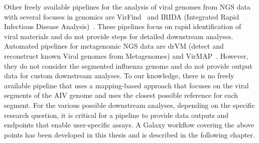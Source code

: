 Other freely available pipelines for the analysis of viral genomes from NGS data with several focuses in genomics are VirFind~\cite{ho2014development} and IRIDA (Integrated Rapid Infectious Disease Analysis)~\cite{matthews2018integrated}. These pipelines focus on rapid identification of viral materials and do not provide steps for detailed downstream analyses. Automated pipelines for metagenomic NGS data are drVM (detect and reconstruct known Viral genomes from Metagenomes) and VirMAP~\cite{lin2017drvm, ajami2018maximal}. However, they do not consider the segmented influenza genome and do not provide output data for custom downstream analyses. To our knowledge, there is no freely available pipeline that uses a mapping-based approach that focuses on the viral segments of the AIV genome and uses the closest possible reference for each segment. For the various possible downstream analyses, depending on the specific research question, it is critical for a pipeline to provide data outputs and endpoints that enable user-specific assays. A Galaxy workflow covering the above points has been developed in this thesis and is described in the following chapter.
